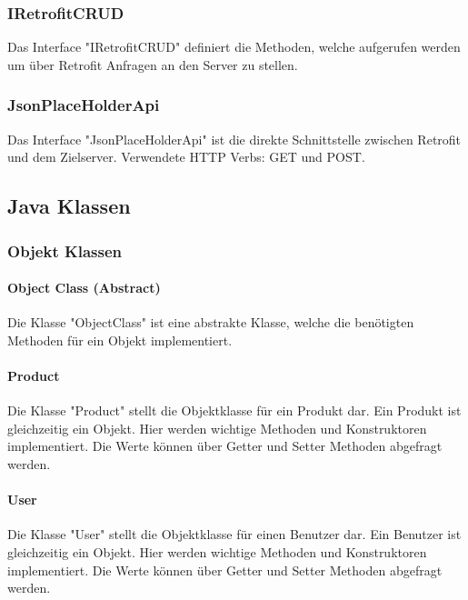 \documentclass{scrartcl}
\begin{document}
\subsubsection{IRetrofitCRUD}

Das Interface "IRetrofitCRUD" definiert die Methoden, welche aufgerufen werden um über Retrofit Anfragen an den Server zu stellen.

\subsubsection{JsonPlaceHolderApi}

Das Interface "JsonPlaceHolderApi" ist die direkte Schnittstelle zwischen Retrofit und dem Zielserver. Verwendete HTTP Verbs: GET und POST.

\subsection{Java Klassen}

\subsubsection{Objekt Klassen}

\paragraph{Object Class (Abstract)}

Die Klasse "ObjectClass" ist eine abstrakte Klasse, welche die benötigten Methoden für ein Objekt implementiert.

\paragraph{Product}

Die Klasse "Product" stellt die Objektklasse für ein Produkt dar. Ein Produkt ist gleichzeitig ein Objekt. Hier werden wichtige Methoden und Konstruktoren implementiert. Die Werte können über Getter und Setter Methoden abgefragt werden.

\paragraph{User}

Die Klasse "User" stellt die Objektklasse für einen Benutzer dar. Ein Benutzer ist gleichzeitig ein Objekt. Hier werden wichtige Methoden und Konstruktoren implementiert. Die Werte können über Getter und Setter Methoden abgefragt werden.
\end{document}
